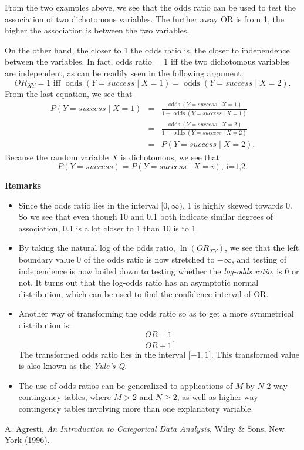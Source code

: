 \documentclass[12pt]{article}
\begin{document}
From the two examples above, we see that the odds ratio can be used to test the association of two dichotomous variables.  The further away OR is from 1, the higher the association is between the two variables.  
\par
On the other hand, the closer to 1 the odds ratio is, the closer to independence between the variables.  In fact, odds ratio = 1 iff the two dichotomous variables are independent, as can be readily seen in the following argument:
$$OR_{XY}=1\mbox{ iff }\operatorname{odds}(Y=success \mid X=1)=\operatorname{odds}(Y=success \mid X=2).$$
From the last equation, we see that 
\begin{eqnarray*}
P(Y=success \mid X=1) &=& \frac{\operatorname{odds}(Y=success \mid X=1)}{1+\operatorname{odds}(Y=success \mid X=1)} \\ 
&=& \frac{\operatorname{odds}(Y=success \mid X=2)}{1+\operatorname{odds}(Y=success \mid X=2)} \\ &=& P(Y=success \mid X=2).
\end{eqnarray*}
Because the random variable $X$ is dichotomous, we see that 
$$P(Y=success)=P(Y=success \mid X=i)\mbox{, i=1,2}.$$
\par
\textbf{Remarks}
\begin{itemize}
\item Since the odds ratio lies in the interval $\lbrack 0,\infty)$, 1 is highly skewed towards 0.  So we see that even though 10 and 0.1 both indicate similar degrees of association, 0.1 is a lot closer to 1 than 10 is to 1.  
\item By taking the natural log of the odds ratio, $\operatorname{ln}(OR_{XY})$, we see that the left boundary value 0 of the odds ratio is now stretched to $-\infty$, and testing of independence is now boiled down to testing whether the \emph{log-odds ratio}, is 0 or not.  It turns out that the log-odds ratio has an asymptotic normal distribution, which can be used to find the confidence interval of OR.
\item Another way of transforming the odds ratio so as to get a more symmetrical distribution is:
$$\frac{OR-1}{OR+1}.$$
The transformed odds ratio lies in the interval $\lbrack -1,1 \rbrack$.  This transformed value is also known as the \emph{Yule's Q}.
\item The use of odds ratios can be generalized to applications of $M$ by $N$ 2-way contingency tables, where $M>2$ and $N\ge2$, as well as higher way contingency tables involving more than one explanatory variable.
\end{itemize}
\begin{thebibliography}{8}
 A. Agresti, {\em An Introduction to Categorical Data Analysis}, Wiley \& Sons, New York (1996).
\end{thebibliography}
\end{document}
